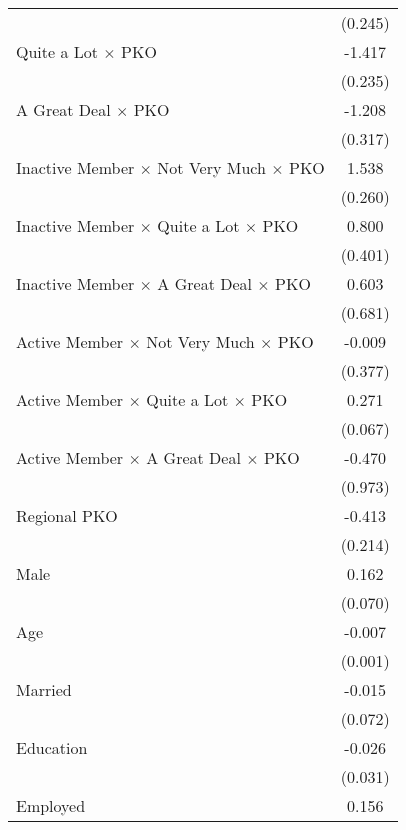 \begin{center}
\begin{singlespace}
\begin{longtable}{l c}
                    &     (0.245)        \\
[0.25em]
Quite a Lot $\times$ PKO&      -1.417\sym{**}\\
                    &     (0.235)        \\
[0.25em]
A Great Deal $\times$ PKO&      -1.208\sym{**}\\
                    &     (0.317)        \\
[0.25em]
Inactive Member $\times$ Not Very Much $\times$ PKO&       1.538\sym{**}\\
                    &     (0.260)        \\
[0.25em]
Inactive Member $\times$ Quite a Lot $\times$ PKO&       0.800\sym{*} \\
                    &     (0.401)        \\
[0.25em]
Inactive Member $\times$ A Great Deal $\times$ PKO&       0.603        \\
                    &     (0.681)        \\
[0.25em]
Active Member $\times$ Not Very Much $\times$ PKO&      -0.009        \\
                    &     (0.377)        \\
[0.25em]
Active Member $\times$ Quite a Lot $\times$ PKO&       0.271\sym{**}\\
                    &     (0.067)        \\
[0.25em]
Active Member $\times$ A Great Deal $\times$ PKO&      -0.470        \\
                    &     (0.973)        \\
[0.25em]
Regional PKO&      -0.413\sym{+} \\
                    &     (0.214)        \\
[0.25em]
Male                &       0.162\sym{*} \\
                    &     (0.070)        \\
[0.25em]
Age                 &      -0.007\sym{**}\\
                    &     (0.001)        \\
[0.25em]
Married             &      -0.015        \\
                    &     (0.072)        \\
[0.25em]
Education           &      -0.026        \\
                    &     (0.031)        \\
[0.25em]
Employed            &       0.156        \\

\end{longtable}
\end{singlespace}
\end{center}
